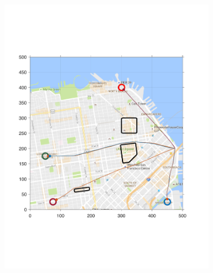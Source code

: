 \begin{figure}[!htb]
\begin{subfigure}{0.5\columnwidth}
  \includegraphics[width=\columnwidth]{figs/sf_d6sep5}
  \label{fig:sf_d6sep5}
\end{subfigure}%
\begin{subfigure}{0.5\columnwidth}

\end{subfigure}
\end{figure}
